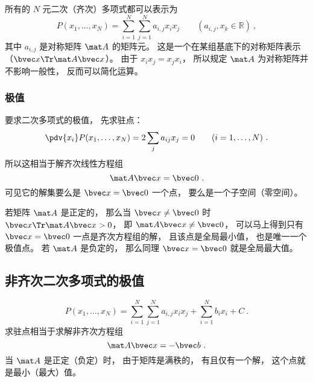 

所有的 $N$ 元二次（齐次）多项式都可以表示为
\begin{equation}
P(x_1,\dots,x_N) = \sum_{i=1}^N\sum_{j=1}^N a_{i,j}x_i x_j \qquad (a_{i,j}, x_k \in \mathbb R)~,
\end{equation}
其中 $a_{i,j}$ 是对称矩阵 $\mat A$ 的矩阵元。 这是一个在某组基底下的对称矩阵表示（$\bvec x\Tr \mat A \bvec x$）。 由于 $x_i x_j = x_j x_i$， 所以规定 $\mat A$ 为对称矩阵并不影响一般性， 反而可以简化运算。

\subsubsection{极值}
要求二次多项式的极值， 先求驻点：
\begin{equation}
\pdv{x_i}P(x_1,\dots,x_N) = 2\sum_j a_{ij} x_j = 0 \qquad (i = 1,\dots,N)~.
\end{equation}
所以这相当于解齐次线性方程组
\begin{equation}
\mat A \bvec x = \bvec 0~.
\end{equation}
可见它的解集要么是 $\bvec x = \bvec 0$ 一个点， 要么是一个子空间（零空间）。

若矩阵 $\mat A$ 是正定的， 那么当 $\bvec x \ne \bvec 0$ 时 $\bvec x\Tr \mat A \bvec x > 0$， 即 $\mat A \bvec x \ne \bvec 0$， 可以马上得到只有 $\bvec x = \bvec 0$ 一点是齐次方程组的解， 且该点是全局最小值， 也是唯一一个极值点。 若 $\mat A$ 是负定的， 那么同理 $\bvec x = \bvec 0$ 就是全局最大值。

\subsection{非齐次二次多项式的极值}
\begin{equation}
P(x_1,\dots,x_N) = \sum_{i=1}^N\sum_{j=1}^N a_{i,j}x_i x_j + \sum_{i=1}^N b_i x_i + C~.
\end{equation}
求驻点相当于求解非齐次方程组
\begin{equation}
\mat A \bvec x = -\bvec b~.
\end{equation}
当 $\mat A$ 是正定（负定）时， 由于矩阵是满秩的， 有且仅有一个解， 这个点就是最小（最大）值。
